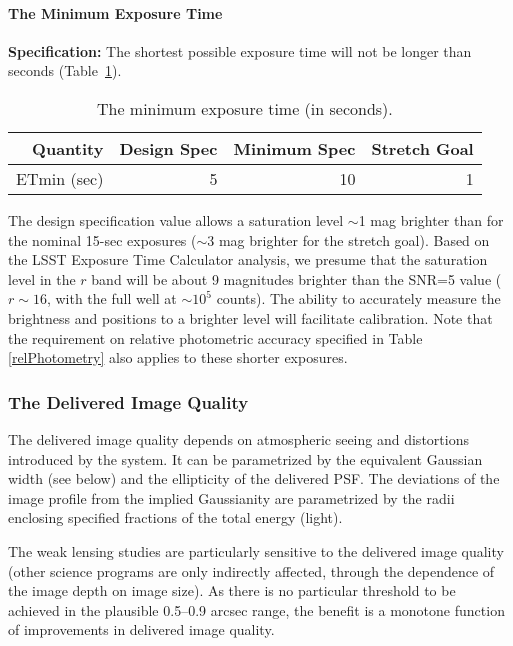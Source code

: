 \paragraph{The Minimum Exposure Time\\}

{\bf Specification:} The shortest possible exposure time will not be
longer than
seconds (Table~\ref{minTexp}).


\begin{table}[h]
\begin{tabular}{|r|r|r|r|}
\hline
Quantity   & Design Spec & Minimum Spec & Stretch Goal           \\
\hline
      ETmin (sec)  &      5       &      10      &       1       \\
\hline
\end{tabular}
\caption{The minimum exposure time (in seconds). }
\label{minTexp}
\end{table}

The design specification value allows a saturation level $\sim$1 mag brighter than for
the nominal 15-sec exposures ($\sim$3 mag brighter for the stretch
goal). Based on the LSST Exposure Time Calculator analysis, we presume that
the saturation level in the $r$ band will be about 9 magnitudes brighter
than the SNR=5 value ($r\sim16$, with the full well at $\sim10^5$
counts). The ability to accurately measure the brightness and positions to
a brighter level will facilitate calibration. Note that the requirement on
relative photometric accuracy specified in Table \ref{relPhotometry} also
applies to these shorter exposures.



\subsubsection{        The Delivered Image Quality       }

The delivered image quality depends on atmospheric seeing and distortions
introduced by the system. It can be parametrized by the equivalent Gaussian
width (see below) and the ellipticity of the delivered PSF.  The deviations
of the image profile from the implied Gaussianity are parametrized by the
radii enclosing specified fractions of the total energy (light).

The weak lensing studies are particularly sensitive to the delivered image
quality (other science programs are only indirectly affected, \eg
through the dependence of the image depth on image size). As there is no
particular threshold to be achieved in the plausible 0.5--0.9 arcsec range,
the benefit is a monotone function of improvements in delivered image
quality.


